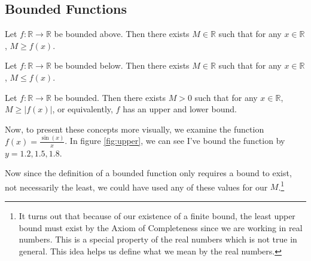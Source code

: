 \documentclass[11pt]{article}
\numberwithin{lemma}{section}
\numberwithin{equation}{section}
\numberwithin{define}{section}
\numberwithin{prop}{section}
\numberwithin{figure}{section}
\numberwithin{theorem}{section}
\numberwithin{cor}{section}
\newcounter{ex}[section]
\numberwithin{ex}{section}
\def\real{\mathbb{R}}
\begin{document}
\subsection{Bounded Functions}
\begin{define}
Let $f:\real\to\real$ be bounded above. Then there exists $M\in\real$ such that
for any $x\in\real$, $M\ge f(x)$.
\end{define}
\begin{define}
	Let $f:\real\to\real$ be bounded below. Then there exists $M\in\real$ such that for any $x\in\real$, $M\le f(x)$.
\end{define}
\begin{define}
	Let $f:\real\to\real$ be bounded. Then there exists $M>0$ such that for any $x\in\real$, $M\ge |f(x)|$, or equivalently, $f$ has an upper and lower bound.	
\end{define}
Now, to present these concepts more visually, we examine the function $f(x)=\frac{\sin(x)}{x}$. 
In figure \eqref{fig:upper}, we can see I've bound the function by $y=1.2,1.5,1.8$. 
\begin{figure}[h]
	\centering
	\caption{}
	\label{fig:upper}
\end{figure}
Now since the definition of a bounded function only requires a bound to exist, not necessarily the least, we could have used any of these values for our $M$.\footnote{
It turns out that because of our existence of a finite bound, the least upper bound must exist by the Axiom of Completeness since we are working in real numbers. This is a special property of the real numbers which is not true in general. This idea helps us define what we mean by the real numbers.}
\end{document}
